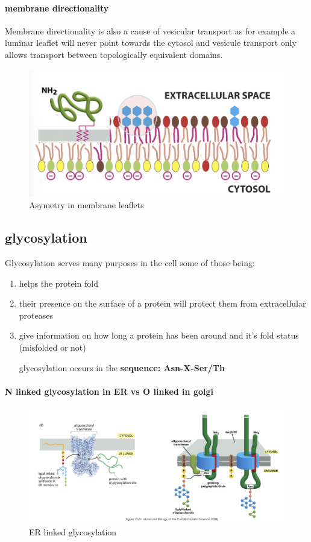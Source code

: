 \documentclass[../main.tex]{subfiles}
\begin{document}
\paragraph{membrane directionality}
Membrane directionality is also a cause of vesicular transport as for example a luminar leaflet will never point towards the cytosol and vesicule transport only allows transport between topologically equivalent domains. 

\begin{figure}[H]
    \centering
    \includegraphics[width=0.7\linewidth]{asymetry.png}
    \caption{Asymetry in membrane leaflets}
    \label{fig:enter-label}
\end{figure}

\subsection{glycosylation}
Glycosylation serves many purposes in the cell some of those being: 
\begin{enumerate}
    \item helps the protein fold 
    \item their presence on the surface of a protein will protect them from extracellular proteases
    \item give information on how long a protein has been around and it's fold status (misfolded or not)

glycosylation occurs in the\textbf{ sequence:  Asn-X-Ser/Th}
\end{enumerate}
\paragraph{N linked glycosylation in ER vs O linked in golgi}
\begin{figure}[H]
    \centering
    \includegraphics[width=\linewidth]{ERLinkedGlyc.png}
    \caption{ER linked glycosylation}
    \label{fig:enter-label}
\end{figure}
\end{document}
